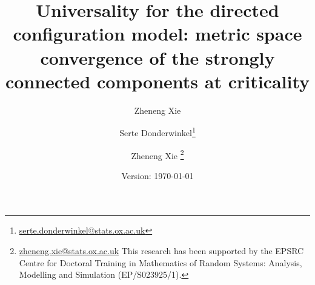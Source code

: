 \documentclass[notitlepage,11pt, a4paper]{article}
\title{Universality for the directed configuration model: metric space convergence of the strongly connected components at criticality}
\author{ \and Zheneng Xie}
\author{Serte Donderwinkel\thanks{\href{mailto:serte.donderwinkel@stats.ox.ac.uk}{serte.donderwinkel@stats.ox.ac.uk}} \and Zheneng Xie \thanks{\href{zheneng.xie@stats.ox.ac.uk}{zheneng.xie@stats.ox.ac.uk} This research has been supported by the EPSRC Centre for Doctoral Training in Mathematics of Random Systems: Analysis, Modelling and Simulation (EP/S023925/1).}}
\date{Version: \today}
\begin{document}
\maketitle










\newpage 

\begin{appendices}
%


\end{appendices}



\end{document}
